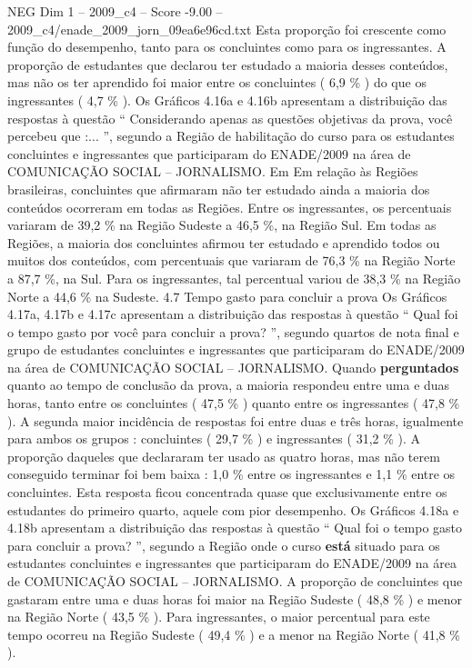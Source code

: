 \begin{textsample}{NEG Dim 1 – 2009\_c4 – Score -9.00 – 2009\_c4/enade\_2009\_jorn\_09ea6e96cd.txt}
Esta proporção foi crescente como função do desempenho, tanto para os concluintes como para os ingressantes.
A proporção de estudantes que declarou ter estudado a maioria desses conteúdos, mas não os ter aprendido foi maior entre os concluintes ( 6,9 \% ) do que os ingressantes ( 4,7 \% ).
Os Gráficos 4.16a e 4.16b apresentam a distribuição das respostas à questão “ Considerando apenas as questões objetivas da prova, você percebeu que :... ”, segundo a Região de habilitação do curso para os estudantes concluintes e ingressantes que participaram do ENADE/2009 na área de COMUNICAÇÃO SOCIAL – JORNALISMO.
Em Em relação às Regiões brasileiras, concluintes que afirmaram não ter estudado ainda a maioria dos conteúdos ocorreram em todas as Regiões.
Entre os ingressantes, os percentuais variaram de 39,2 \% na Região Sudeste a 46,5 \%, na Região Sul.
Em todas as Regiões, a maioria dos concluintes afirmou ter estudado e aprendido todos ou muitos dos conteúdos, com percentuais que variaram de 76,3 \% na Região Norte a 87,7 \%, na Sul.
Para os ingressantes, tal percentual variou de 38,3 \% na Região Norte a 44,6 \% na Sudeste. 4.7 Tempo gasto para concluir a prova Os Gráficos 4.17a, 4.17b e 4.17c apresentam a distribuição das respostas à questão “ Qual foi o tempo gasto por você para concluir a prova? ”, segundo quartos de nota final e grupo de estudantes concluintes e ingressantes que participaram do ENADE/2009 na área de COMUNICAÇÃO SOCIAL – JORNALISMO.
Quando \textbf{perguntados} quanto ao tempo de conclusão da prova, a maioria respondeu entre uma e duas horas, tanto entre os concluintes ( 47,5 \% ) quanto entre os ingressantes ( 47,8 \% ).
A segunda maior incidência de respostas foi entre duas e três horas, igualmente para ambos os grupos : concluintes ( 29,7 \% ) e ingressantes ( 31,2 \% ).
A proporção daqueles que declararam ter usado as quatro horas, mas não terem conseguido terminar foi bem baixa : 1,0 \% entre os ingressantes e 1,1 \% entre os concluintes.
Esta resposta ficou concentrada quase que exclusivamente entre os estudantes do primeiro quarto, aquele com pior desempenho.
Os Gráficos 4.18a e 4.18b apresentam a distribuição das respostas à questão “ Qual foi o tempo gasto para concluir a prova? ”, segundo a Região onde o curso \textbf{está} situado para os estudantes concluintes e ingressantes que participaram do ENADE/2009 na área de COMUNICAÇÃO SOCIAL – JORNALISMO.
A proporção de concluintes que gastaram entre uma e duas horas foi maior na Região Sudeste ( 48,8 \% ) e menor na Região Norte ( 43,5 \% ).
Para ingressantes, o maior percentual para este tempo ocorreu na Região Sudeste ( 49,4 \% ) e a menor na Região Norte ( 41,8 \% ).

\end{textsample}
